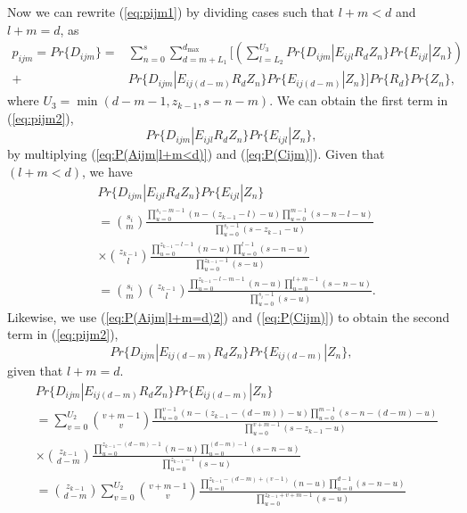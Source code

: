 \documentclass[11pt]{article}\topmargin 0mm
\begin{document}
Now we can rewrite (\ref{eq:pijm1}) by dividing cases such that $l+m<d$ and $l+m=d$, as
\begin{equation}
\label{eq:pijm2}
\begin{split}
p_{ijm} = Pr\{D_{ijm}\} = & \sum_{n=0}^s \sum_{d=m+L_1}^{d_{\max}} \Biggl[ \left(\sum_{l=L_2}^{U_3} Pr\{D_{ijm}|E_{ijl} R_d Z_n\}Pr\{E_{ijl} | Z_n\} \right) \\
+ & Pr\{D_{ijm}|E_{ij(d-m)} R_d Z_n\}Pr\{E_{ij(d-m)} | Z_n\} \Biggr]Pr\{R_d\} Pr\{Z_n\},
\end{split}
\end{equation}
where $U_3=\min(d-m-1,z_{k-1},s-n-m)$. We can obtain the first
term in (\ref{eq:pijm2}), \[Pr\{D_{ijm}|E_{ijl} R_d
Z_n\}Pr\{E_{ijl} | Z_n\},\] by multiplying
(\ref{eq:P(Aijm|l+m<d)}) and (\ref{eq:P(Cijm)}). Given that
$(l+m<d)$, we have
\begin{equation}
\label{eq:P(Aijm|l+m<d)P(Cijm)}
\begin{split}
& Pr\{D_{ijm}|E_{ijl} R_d Z_n\}Pr\{E_{ijl}|Z_n\} \\
& = {s_i \choose m} \frac{\prod_{u=0}^{s_i-m-1}(n-(z_{k-1}-l)-u) \prod_{u=0}^{m-1}(s-n-l-u)}{\prod_{u=0}^{s_i-1}(s-z_{k-1}-u)} \\
& \times {z_{k-1} \choose l} \frac{\prod_{u=0}^{z_{k-1}-l-1}(n-u) \prod_{u=0}^{l-1}(s-n-u)}{\prod_{u=0}^{z_{k-1}-1}(s-u)} \\
& = {s_i \choose m}{z_{k-1} \choose l} \frac{\prod_{u=0}^{z_{k-1}-l-m-1}(n-u)\prod_{u=0}^{l+m-1}(s-n-u)}{\prod_{u=0}^{s_i-1}(s-u)} .
\end{split}
\end{equation}
Likewise, we use (\ref{eq:P(Aijm|l+m=d)2}) and
(\ref{eq:P(Cijm)}) to obtain the second term in (\ref{eq:pijm2}), \[Pr\{D_{ijm}|E_{ij(d-m)} R_d Z_n\}Pr\{E_{ij(d-m)} | Z_n\},\]
given that $l+m=d$.
\begin{equation}
\label{eq:P(Aijm|l+m=d)P(Cijm)}
\begin{split}
& Pr\{D_{ijm}|E_{ij(d-m)} R_d Z_n\}Pr\{E_{ij(d-m)} | Z_n\} \\
& = \sum_{v=0}^{U_2} {v+m-1 \choose v} \frac{\prod_{u=0}^{v-1} (n-(z_{k-1}-(d-m))-u) \prod_{u=0}^{m-1} (s-n-(d-m)-u)}{\prod_{u=0}^{v+m-1}(s-z_{k-1}-u)} \\
& \times {z_{k-1} \choose d-m} \frac{\prod_{u=0}^{z_{k-1}-(d-m)-1}(n-u) \prod_{u=0}^{(d-m)-1}(s-n-u)}{\prod_{u=0}^{z_{k-1}-1}(s-u)} \\
& = {z_{k-1} \choose d-m} \sum_{v=0}^{U_2} {v+m-1 \choose v} \frac{\prod_{u=0}^{z_{k-1}-(d-m)+(v-1)}(n-u)\prod_{u=0}^{d-1}(s-n-u)}{\prod_{u=0}^{z_{k-1}+v+m-1}(s-u)}
\end{split}
\end{equation}
\end{document}
